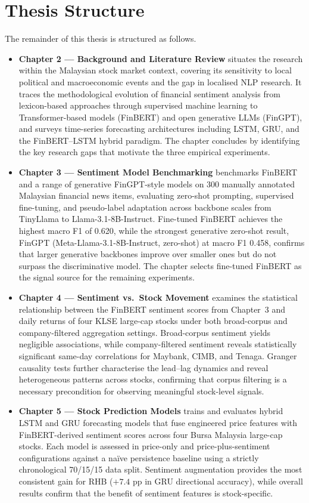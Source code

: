 \documentclass[12pt]{ucetd}
\begin{document}
\section{Thesis Structure}
The remainder of this thesis is structured as follows.
\begin{itemize}
    \item \textbf{Chapter 2 --- Background and Literature Review} situates the research within the Malaysian stock market context, covering its sensitivity to local political and macroeconomic events and the gap in localised NLP research. It traces the methodological evolution of financial sentiment analysis from lexicon-based approaches through supervised machine learning to Transformer-based models (FinBERT) and open generative LLMs (FinGPT), and surveys time-series forecasting architectures including LSTM, GRU, and the FinBERT--LSTM hybrid paradigm. The chapter concludes by identifying the key research gaps that motivate the three empirical experiments.

    \item \textbf{Chapter 3 --- Sentiment Model Benchmarking} benchmarks FinBERT and a range of generative FinGPT-style models on 300 manually annotated Malaysian financial news items, evaluating zero-shot prompting, supervised fine-tuning, and pseudo-label adaptation across backbone scales from TinyLlama to Llama-3.1-8B-Instruct. Fine-tuned FinBERT achieves the highest macro F1 of 0.620, while the strongest generative zero-shot result, FinGPT (Meta-Llama-3.1-8B-Instruct, zero-shot) at macro F1 0.458, confirms that larger generative backbones improve over smaller ones but do not surpass the discriminative model. The chapter selects fine-tuned FinBERT as the signal source for the remaining experiments.

    \item \textbf{Chapter 4 --- Sentiment vs.\ Stock Movement} examines the statistical relationship between the FinBERT sentiment scores from Chapter~3 and daily returns of four KLSE large-cap stocks under both broad-corpus and company-filtered aggregation settings. Broad-corpus sentiment yields negligible associations, while company-filtered sentiment reveals statistically significant same-day correlations for Maybank, CIMB, and Tenaga. Granger causality tests further characterise the lead--lag dynamics and reveal heterogeneous patterns across stocks, confirming that corpus filtering is a necessary precondition for observing meaningful stock-level signals.

    \item \textbf{Chapter 5 --- Stock Prediction Models} trains and evaluates hybrid LSTM and GRU forecasting models that fuse engineered price features with FinBERT-derived sentiment scores across four Bursa Malaysia large-cap stocks. Each model is assessed in price-only and price-plus-sentiment configurations against a na\"ive persistence baseline using a strictly chronological 70/15/15 data split. Sentiment augmentation provides the most consistent gain for RHB ($+7.4$ pp in GRU directional accuracy), while overall results confirm that the benefit of sentiment features is stock-specific.


\end{itemize}
\end{document}
